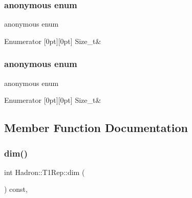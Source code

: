 \subsubsection{\texorpdfstring{anonymous enum}{anonymous enum}}
{\footnotesize\ttfamily anonymous enum}

\begin{DoxyEnumFields}{Enumerator}
[0pt][0pt]{}\mbox{\label{structHadron_1_1T1Rep_a6f562e59675e14071d25dc4953923266a9e0e2632c004c18c794ed8666cdba154}} 
Size\+\_\+t&\\
\hline

\end{DoxyEnumFields}
\mbox{\label{structHadron_1_1T1Rep_a8d567fae3d37d1264644594395c73e8e}} 
\subsubsection{\texorpdfstring{anonymous enum}{anonymous enum}}
{\footnotesize\ttfamily anonymous enum}

\begin{DoxyEnumFields}{Enumerator}
[0pt][0pt]{}\mbox{\label{structHadron_1_1T1Rep_a6f562e59675e14071d25dc4953923266a9e0e2632c004c18c794ed8666cdba154}} 
Size\+\_\+t&\\
\hline

\end{DoxyEnumFields}


\subsection{Member Function Documentation}
\mbox{\label{structHadron_1_1T1Rep_aa5fae2d46d90d11f94ed0b78626e7758}} 
\subsubsection{\texorpdfstring{dim()}{dim()}\hspace{0.1cm}{\footnotesize\ttfamily [1/3]}}
{\footnotesize\ttfamily int Hadron\+::\+T1\+Rep\+::dim (\begin{DoxyParamCaption}{ }\end{DoxyParamCaption}) const\hspace{0.3cm}{\ttfamily [inline]}, {\ttfamily [virtual]}}



